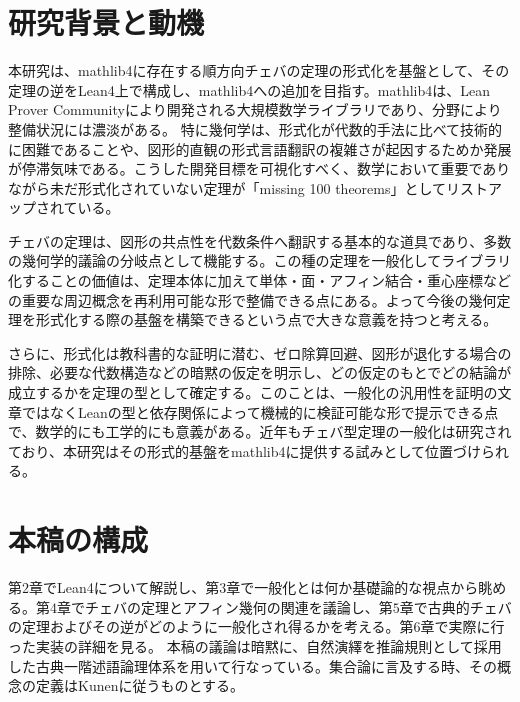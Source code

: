 \documentclass[a4paper,12pt]{bxjsbook}
\newlength{\customindent}
\newenvironment{body}{
  \par
  \begingroup
  \setlength{\leftskip}{\customindent}
  \setlength{\rightskip}{0pt}
  \setlength{\parindent}{1em}
  \setlength{\displayindent}{\customindent}
  \setlength{\displaywidth}{\dimexpr\linewidth-\customindent\relax}
}{
  \par
  \endgroup
}
\theoremstyle{theorem}
\begin{document}
    \section{研究背景と動機}
    \begin{body}
        \indent 本研究は、mathlib4に存在する順方向チェバの定理の形式化を基盤として、その定理の逆をLean4上で構成し、mathlib4への追加を目指す。mathlib4は、Lean Prover Communityにより開発される大規模数学ライブラリ\cite{LeanProverCommunity}であり、分野により整備状況には濃淡がある。
        特に幾何学は、形式化が代数的手法に比べて技術的に困難であることや、図形的直観の形式言語翻訳の複雑さが起因するためか発展が停滞気味である。こうした開発目標を可視化すべく、数学において重要でありながら未だ形式化されていない定理が「missing 100 theorems」としてリストアップされている。

        \indent チェバの定理は、図形の共点性を代数条件へ翻訳する基本的な道具であり、多数の幾何学的議論の分岐点として機能する。この種の定理を一般化してライブラリ化することの価値は、定理本体に加えて単体・面・アフィン結合・重心座標などの重要な周辺概念を再利用可能な形で整備できる点にある。よって今後の幾何定理を形式化する際の基盤を構築できるという点で大きな意義を持つと考える。

        \indent さらに、形式化は教科書的な証明に潜む、ゼロ除算回避、図形が退化する場合の排除、必要な代数構造などの暗黙の仮定を明示し、どの仮定のもとでどの結論が成立するかを定理の型として確定する。このことは、一般化の汎用性を証明の文章ではなくLeanの型と依存関係によって機械的に検証可能な形で提示できる点で、数学的にも工学的にも意義がある。近年もチェバ型定理の一般化は研究されており、本研究はその形式的基盤をmathlib4に提供する試みとして位置づけられる。
    \end{body}

    \section{本稿の構成}
    \begin{body}
        \indent 第$2$章でLean4について解説し、第$3$章で一般化とは何か基礎論的な視点から眺める。第$4$章でチェバの定理とアフィン幾何の関連を議論し、第$5$章で古典的チェバの定理およびその逆がどのように一般化され得るかを考える。第$6$章で実際に行った実装の詳細を見る。
        \indent 本稿の議論は暗黙に、自然演繹を推論規則として採用した古典一階述語論理体系を用いて行なっている。集合論に言及する時、その概念の定義はKunenに従うものとする。\cite{Kunen}
    \end{body}
\end{document}
